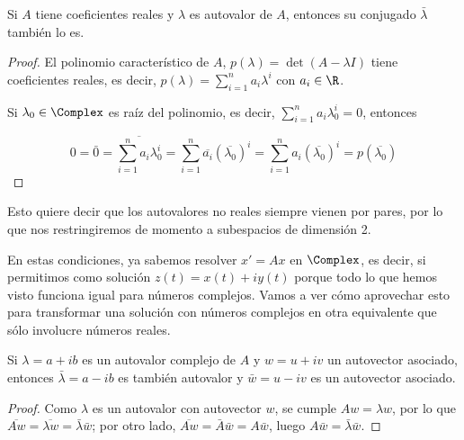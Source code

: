 \documentclass[../ecuaciones_diferenciales.tex]{subfiles}
\begin{document}
  \begin{proposition}
    Si \(A\) tiene coeficientes reales y \(\lambda\) es autovalor de \(A\),
    entonces su conjugado \(\bar{\lambda}\) también lo es.
    \begin{proof}
      El polinomio característico de \(A\), \(p(\lambda) = \det(A-\lambda I)\)
      tiene coeficientes reales, es decir, \(p(\lambda) = \sum_{i=1}^n
      a_i\lambda^i\) con \(a_i \in \R\).

      Si \(\lambda_0 \in \Complex\) es raíz del polinomio, es decir, \(\sum_{i=1}^n
      a_i\lambda_0^i = 0\), entonces

      \[0 = \bar{0} = \overline{\sum_{i=1}^n a_i\lambda_0^i} = \sum_{i=1}^n
        \overline{a_i}(\overline{\lambda_0})^i = \sum_{i=1}^n
        a_i(\overline{\lambda_0})^i = p(\overline{\lambda_0})\]
    \end{proof}
  \end{proposition}

  \begin{remark}
    Esto quiere decir que los autovalores no reales siempre vienen por pares,
    por lo que nos restringiremos de momento a subespacios de dimensión 2.
  \end{remark}

  \begin{remark}
    En estas condiciones, ya sabemos resolver \(x' = Ax\) en \(\Complex\), es
    decir, si permitimos como solución \(z(t) = x(t) + iy(t)\) porque todo lo
    que hemos visto funciona igual para números complejos. Vamos a ver cómo
    aprovechar esto para transformar una solución con números complejos en otra
    equivalente que sólo involucre números reales.
  \end{remark}

  \begin{proposition}
    Si \(\lambda = a + ib\) es un autovalor complejo de \(A\) y \(w = u + iv\)
    un autovector asociado, entonces \(\bar{\lambda} = a - ib\) es también
    autovalor y \(\bar{w} = u - iv\) es un autovector asociado.
    \begin{proof}
      Como \(\lambda\) es un autovalor con autovector \(w\), se cumple
      \(Aw = \lambda w\), por lo que
      \(\overline{Aw} = \overline{\lambda w} = \bar{\lambda} \bar{w}\); por otro
      lado, \(\overline{Aw} = \bar{A} \bar{w} = A \bar{w}\), luego \(A \bar{w} =
      \bar{\lambda} \bar{w}\).
    \end{proof}
  \end{proposition}
\end{document}
